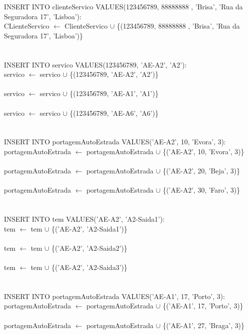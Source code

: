 \documentclass[a4paper]{article}
\begin{document}
INSERT INTO clienteServico VALUES(123456789, 88888888 , 'Brisa', 'Rua da Seguradora 17', 'Lisboa'):\\
CLienteServico $\leftarrow$ ClienteServico $\cup$ \{(123456789, 88888888 , 'Brisa', 'Rua da Seguradora 17', 'Lisboa')\}\\
\\
\\
INSERT INTO servico VALUES(123456789, 'AE-A2', 'A2'):\\
servico $\leftarrow$ servico $\cup$ \{(123456789, 'AE-A2', 'A2')\}\\
\\
servico $\leftarrow$ servico $\cup$ \{(123456789, 'AE-A1', 'A1')\}\\
\\
servico $\leftarrow$ servico $\cup$ \{(123456789, 'AE-A6', 'A6')\}\\
\\
\\
INSERT INTO portagemAutoEstrada VALUES('AE-A2', 10, 'Evora', 3):\\
portagemAutoEstrada $\leftarrow$ portagemAutoEstrada $\cup$ \{('AE-A2', 10, 'Evora', 3)\}\\
\\
portagemAutoEstrada $\leftarrow$ portagemAutoEstrada $\cup$ \{('AE-A2', 20, 'Beja', 3)\}\\
\\
portagemAutoEstrada $\leftarrow$ portagemAutoEstrada $\cup$ \{('AE-A2', 30, 'Faro', 3)\}\\
\\
\\
INSERT INTO tem VALUES('AE-A2', 'A2-Saida1'):\\
tem $\leftarrow$ tem $\cup$ \{('AE-A2', 'A2-Saida1')\}\\
\\
tem $\leftarrow$ tem $\cup$ \{('AE-A2', 'A2-Saida2')\}\\
\\
tem $\leftarrow$ tem $\cup$ \{('AE-A2', 'A2-Saida3')\}\\
\\
\\
INSERT INTO portagemAutoEstrada VALUES('AE-A1', 17, 'Porto', 3):\\
portagemAutoEstrada $\leftarrow$ portagemAutoEstrada $\cup$ \{('AE-A1', 17, 'Porto', 3)\}\\
\\
portagemAutoEstrada $\leftarrow$ portagemAutoEstrada $\cup$ \{('AE-A1', 27, 'Braga', 3)\}\\
\end{document}

